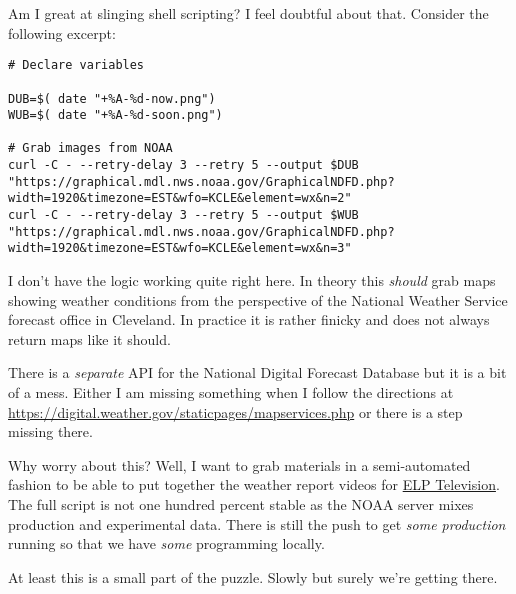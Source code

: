 Am I great at slinging shell scripting? I feel doubtful about that.
Consider the following excerpt:

\begin{verbatim}
# Declare variables

DUB=$( date "+%A-%d-now.png")
WUB=$( date "+%A-%d-soon.png")

# Grab images from NOAA
curl -C - --retry-delay 3 --retry 5 --output $DUB "https://graphical.mdl.nws.noaa.gov/GraphicalNDFD.php?width=1920&timezone=EST&wfo=KCLE&element=wx&n=2"
curl -C - --retry-delay 3 --retry 5 --output $WUB "https://graphical.mdl.nws.noaa.gov/GraphicalNDFD.php?width=1920&timezone=EST&wfo=KCLE&element=wx&n=3"
\end{verbatim}

I don't have the logic working quite right here. In theory this
\emph{should} grab maps showing weather conditions from the perspective
of the National Weather Service forecast office in Cleveland. In
practice it is rather finicky and does not always return maps like it
should.

There is a \emph{separate} API for the National Digital Forecast
Database but it is a bit of a mess. Either I am missing something when I
follow the directions at
\url{https://digital.weather.gov/staticpages/mapservices.php} or there
is a step missing there.

Why worry about this? Well, I want to grab materials in a semi-automated
fashion to be able to put together the weather report videos for
\href{https://coyote.works/}{ELP Television}. The full script is not one
hundred percent stable as the NOAA server mixes production and
experimental data. There is still the push to get \emph{some production}
running so that we have \emph{some} programming locally.

At least this is a small part of the puzzle. Slowly but surely we're
getting there.
